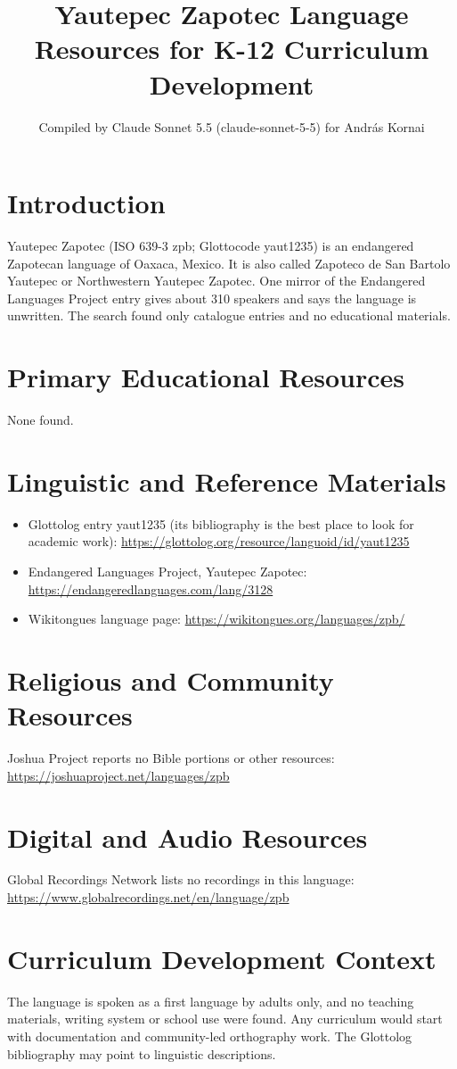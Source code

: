 \documentclass[12pt]{article}
\title{Yautepec Zapotec Language Resources for K-12 Curriculum Development}
\author{Compiled by Claude Sonnet 5.5 (claude-sonnet-5-5) for Andr\'as Kornai}
\date{}
\begin{document}
\maketitle

\section{Introduction}
Yautepec Zapotec (ISO 639-3 zpb; Glottocode yaut1235) is an endangered Zapotecan language of Oaxaca, Mexico. It is also called Zapoteco de San Bartolo Yautepec or Northwestern Yautepec Zapotec. One mirror of the Endangered Languages Project entry gives about 310 speakers and says the language is unwritten. The search found only catalogue entries and no educational materials.

\section{Primary Educational Resources}
None found.

\section{Linguistic and Reference Materials}
\begin{itemize}
\item Glottolog entry yaut1235 (its bibliography is the best place to look for academic work): \url{https://glottolog.org/resource/languoid/id/yaut1235}
\item Endangered Languages Project, Yautepec Zapotec: \url{https://endangeredlanguages.com/lang/3128}
\item Wikitongues language page: \url{https://wikitongues.org/languages/zpb/}
\end{itemize}

\section{Religious and Community Resources}
Joshua Project reports no Bible portions or other resources: \url{https://joshuaproject.net/languages/zpb}

\section{Digital and Audio Resources}
Global Recordings Network lists no recordings in this language: \url{https://www.globalrecordings.net/en/language/zpb}

\section{Curriculum Development Context}
The language is spoken as a first language by adults only, and no teaching materials, writing system or school use were found. Any curriculum would start with documentation and community-led orthography work. The Glottolog bibliography may point to linguistic descriptions.
\end{document}
